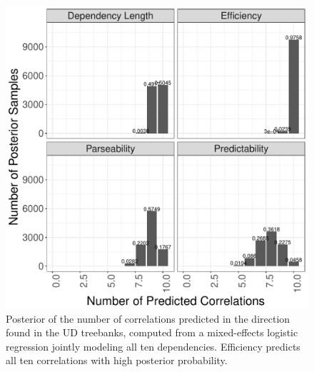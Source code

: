 \documentclass[12pt]{article}
\begin{document}
\begin{figure}
    \centering
     \includegraphics[scale=.45]{../results/correlations/figures/posterior-satisfied-universals-together.pdf}

	\caption{Posterior of the number of correlations predicted in the direction found in the UD treebanks, computed from a mixed-effects logistic regression jointly modeling all ten dependencies. Efficiency predicts all ten correlations with high posterior probability.}
    \label{fig:posterior-satisfied-count}
\end{figure}
\end{document}

